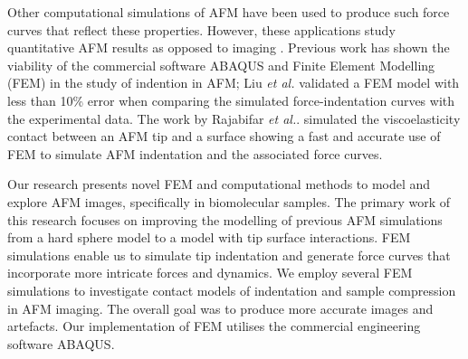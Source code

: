 Other computational simulations of AFM have been used to produce such force curves that reflect these properties. However, these applications study quantitative AFM results as opposed to imaging \cite{liu2019finite,han2021modified,roduit2009stiffness,kontomaris2020hertz,senda2016computational}. Previous work has shown the viability of the commercial software ABAQUS and Finite Element Modelling (FEM) in the study of indention in AFM; Liu \textit{et al.}\cite{liu2019finite} validated a FEM model with less than 10\% error when comparing the simulated force-indentation curves with the experimental data. The work by Rajabifar \textit{et al.}.\cite{rajabifar2021fast} simulated the viscoelasticity contact between an AFM tip and a surface showing a fast and accurate use of FEM to simulate AFM indentation and the associated force curves.  

Our research presents novel FEM and computational methods to model and explore AFM images, specifically in biomolecular samples. The primary work of this research focuses on improving the modelling of previous AFM simulations from a hard sphere model to a model with tip surface interactions. FEM simulations enable us to simulate tip indentation and generate force curves that incorporate more intricate forces and dynamics. We employ several FEM simulations to investigate contact models of indentation and sample compression in AFM imaging. The overall goal was to produce more accurate images and artefacts. Our implementation of FEM utilises the commercial engineering software ABAQUS. 